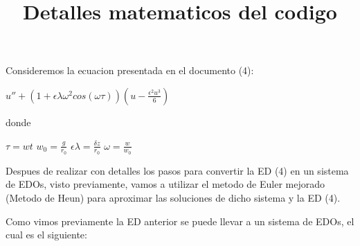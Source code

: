 \documentclass{article}
\title{Detalles matematicos del codigo}
\begin{document}
Consideremos la ecuacion presentada en el documento (4): 
\begin{center}
    $u''+(1+\epsilon \lambda \omega^2 cos(\omega \tau))(u - \frac{\epsilon^2 u^3}{6})$
\end{center}
donde
\begin{center}
    $\tau = wt$
    $w_0 = \frac{g}{r_0}$
    $\epsilon \lambda = \frac{\delta z}{r_0}$
    $\omega = \frac{w}{w_0}$
\end{center}
Despues de realizar con detalles los pasos para convertir la ED (4) en un sistema de EDOs, visto previamente, vamos
a utilizar el metodo de Euler mejorado (Metodo de Heun) para aproximar las soluciones de dicho sistema y la ED (4).

Como vimos previamente la ED anterior se puede llevar a un sistema de EDOs, el cual es el siguiente:

\begin{center}
        
\end{center}
\end{document}
